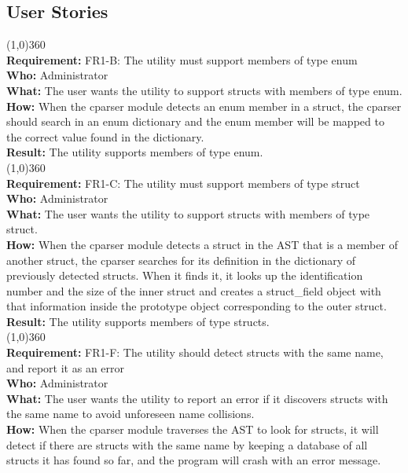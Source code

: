 \subsection{User Stories}
\line(1,0){360}\\
\textbf{Requirement:} FR1-B: The utility must support members of type enum\\
\textbf{Who:} Administrator\\
\textbf{What:} The user wants the utility to support structs with members of type enum.\\
\textbf{How:} When the cparser module detects an enum member in a struct, the cparser should search in an enum dictionary and the enum member will be mapped to the correct value found in the dictionary. \\
\textbf{Result:} The utility supports members of type enum.\\
\line(1,0){360}\\
\textbf{Requirement:} FR1-C: The utility must support members of type struct\\
\textbf{Who:} Administrator\\
\textbf{What:} The user wants the utility to support structs with members of type struct. \\
\textbf{How:} When the cparser module detects a struct in the AST that is a member of another struct, the cparser searches for its definition in the dictionary of previously detected structs. When it finds it, it looks up the identification number and the size of the inner struct and creates a struct\_field object with that information inside the prototype object corresponding to the outer struct.\\
\textbf{Result:} The utility supports members of type structs.\\
\line(1,0){360}\\
\textbf{Requirement:} FR1-F: The utility should detect structs with the same name, and report it as an error\\
\textbf{Who:} Administrator\\
\textbf{What:} The user wants the utility to report an error if it discovers structs with the same name to avoid unforeseen name collisions.\\
\textbf{How:} When the cparser module traverses the AST to look for structs, it will detect if there are structs with the same name by keeping a database of all structs it has found so far, and the program will crash with an error message.\\
